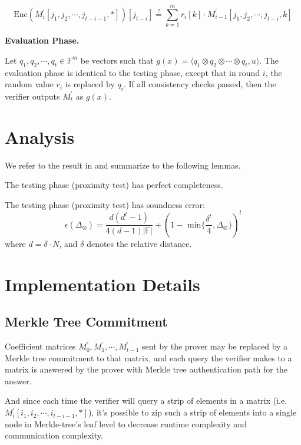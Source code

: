 $$
    \text{Enc}(M_i^\prime[j_1, j_2, \cdots, j_{t-i-1}, *])[j_{t-i}] \stackrel{?}{=} \sum_{k=1}^m r_i[k] \cdot M_{i-1}^{\prime}[j_1,j_2, \cdots, j_{t-i},k]
$$

\textbf{Evaluation Phase.}

Let $q_1, q_2, \cdots, q_t \in \mathbb{F}^{m}$ be vectors such that $g(x) =\langle q_1 \otimes q_2 \otimes \cdots \otimes q_t, u \rangle $. The evaluation phase is identical to the testing phase, except that in round $i$, the random value $r_i$ is replaced by $q_i$. If all consistency checks passed, then the verifier outputs $M_{t}^{\prime}$ as $g(x)$.

\section{Analysis}

We refer to the result in \cite{cryptoeprint:2020/1426} and summarize to the following lemmas. 

\begin{lemma}
\label{lemma:pc-completeness}
The testing phase (proximity test) has perfect completeness.
\end{lemma}

\begin{lemma}
\label{lemma:pc-soundness}
The testing phase (proximity test) has soundness error:
$$
    \epsilon(\Delta_\otimes) = \frac{d(d^t-1)}{4(d-1)|\mathbb{F}|} + (1 - \text{ min}\{\frac{\delta^t}{4}, \Delta_\otimes \})^l
$$
where $d = \delta \cdot N$, and $\delta$ denotes the relative distance.
\end{lemma}



\section{Implementation Details}

\subsection{Merkle Tree Commitment}

Coefficient matrices $M_0^\prime, M_1^\prime, \cdots, M_{t-1}^\prime$ sent by the prover may be replaced by a Merkle tree commitment to that matrix, and each query the verifier makes to a matrix is answered by the prover with Merkle tree authentication path for the answer.

And since each time the verifier will query a strip of elements in a matrix (i.e. $M_i^\prime[i_1, i_2, \cdots, i_{t-i-1}, *]$), it's possible to zip such a strip of elements into a single node in Merkle-tree's leaf level to decrease runtime complexity and communication complexity.

